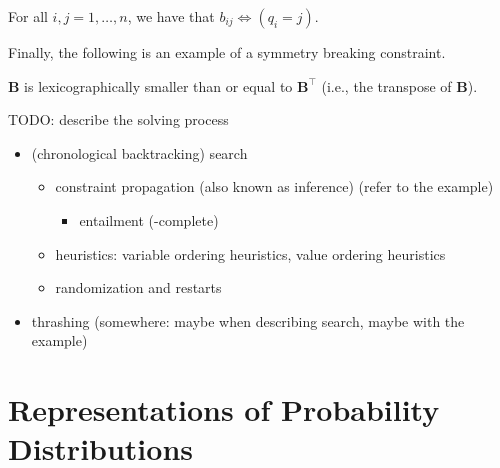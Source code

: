 \begin{example}[$n$ queens]
  \begin{constraint}[Channelling]
    For all $i, j = 1, \dots, n$, we have that $b_{ij} \Leftrightarrow (q_i = j)$.
  \end{constraint}

  Finally, the following is an example of a symmetry breaking constraint.

  \begin{constraint}
    $\mathbf{B}$ is lexicographically smaller than or equal to $\mathbf{B}^\top$ (i.e., the transpose of $\mathbf{B}$).
  \end{constraint}
\end{example}

TODO: describe the solving process

\begin{itemize}
\item (chronological backtracking) search
  \begin{itemize}
  \item constraint propagation (also known as inference) (refer to the example)
    \begin{itemize}
    \item entailment (\coNP-complete)
    \end{itemize}
  \item heuristics: variable ordering heuristics, value ordering heuristics
  \item randomization and restarts
  \end{itemize}
\item thrashing (somewhere: maybe when describing search, maybe with the example)
\end{itemize}

\section{Representations of Probability Distributions}

